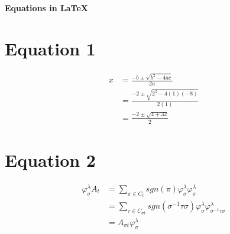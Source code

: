 \documentclass{article}
\begin{document}
\begin{center}
    \Large\textbf{Equations in LaTeX}
\end{center}

\section*{Equation 1}

\begin{align*}
x &= \frac{-b \pm \sqrt{b^{2}-4ac}}{2a} \\
  &= \frac{-2 \pm \sqrt{2^{2}-4(1)(-8)}}{2(1)} \\
  &= \frac{-2 \pm \sqrt{4+32}}{2}
\end{align*}

\section*{Equation 2}

\begin{align*}
\varphi^{\lambda}_{\sigma}A_{t} 
&= \sum_{\pi \in C_{t}} sgn(\pi)\varphi^{\lambda}_{\sigma}\varphi^{\lambda}_{\pi} \\
&= \sum_{\tau \in C_{\sigma t}} sgn(\sigma^{-1}\tau\sigma)\varphi^{\lambda}_{\sigma}\varphi^{\lambda}_{\sigma^{-1}\tau\sigma} \\
&= A_{\sigma t} \varphi^{\lambda}_{\sigma}
\end{align*}
\end{document}
